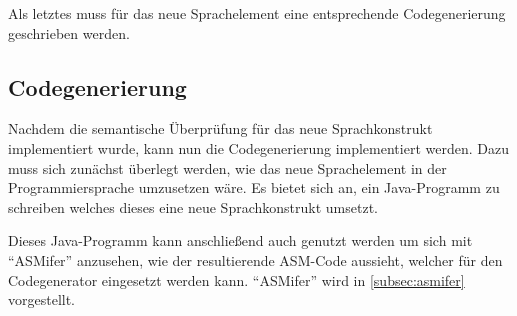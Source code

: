 Als letztes muss für das neue Sprachelement eine entsprechende Codegenerierung geschrieben werden.

\subsection{Codegenerierung}
Nachdem die semantische Überprüfung für das neue Sprachkonstrukt implementiert wurde, kann nun die Codegenerierung implementiert werden. Dazu muss sich zunächst überlegt werden, wie das neue Sprachelement in der Programmiersprache umzusetzen wäre. Es bietet sich an, ein Java-Programm zu schreiben welches dieses eine neue Sprachkonstrukt umsetzt.

Dieses Java-Programm kann anschließend auch genutzt werden um sich mit \enquote{ASMifer} anzusehen, wie der resultierende ASM-Code aussieht, welcher für den Codegenerator eingesetzt werden kann. \enquote{ASMifer} wird in \cref{subsec:asmifer} vorgestellt.
